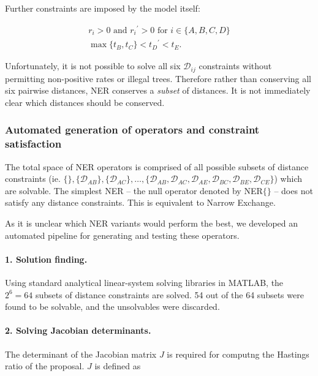 \documentclass[10pt,letterpaper]{article}
\begin{document}
Further constraints are imposed by the model itself:


\begin{align}
	r_i > 0 \text{ and } {r_i}^\prime > 0 \text { for } i \in \{A,B,C,D\} \\
	\max\{t_B, t_C \} < {t_D}^\prime < t_E.
\end{align}



Unfortunately, it is not possible to solve all six $\mathcal{D}_{ij}$ constraints without permitting non-positive rates or illegal trees. Therefore rather than conserving all six pairwise distances, NER conserves a \textit{subset} of distances. It is not immediately clear which distances should be conserved. 


\subsubsection*{Automated generation of operators and constraint satisfaction}


The total space of NER operators is comprised of all possible subsets of distance constraints (ie. $\{\},\{\mathcal{D}_{AB}\}, \{\mathcal{D}_{AC}\}, \dotso , \{\mathcal{D}_{AB}, \mathcal{D}_{AC}, \mathcal{D}_{AE}, \mathcal{D}_{BC}, \mathcal{D}_{BE}, \mathcal{D}_{CE} \}$) which are solvable. The simplest NER -- the null operator denoted by NER$\{\}$ -- does not satisfy any distance constraints. This is equivalent to Narrow Exchange. 

As it is unclear which NER variants would perform the best, we developed an automated pipeline for generating and testing these operators.


\paragraph{1. Solution finding.} Using standard analytical linear-system solving libraries in MATLAB, the $2^6=64$ subsets of distance constraints are solved. 54 out of the 64 subsets were found to be solvable, and the unsolvables were discarded.


\paragraph{2. Solving Jacobian determinants.} The determinant of the Jacobian matrix $J$ is required for computng the Hastings ratio of the proposal. $J$ is defined as 
\end{document}
